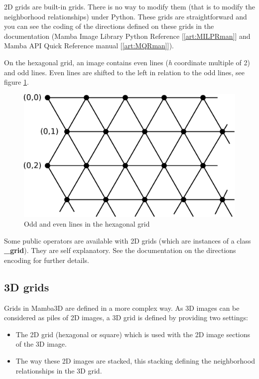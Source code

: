\documentclass[a4paper,10pt,oneside]{article}
\begin{document}
2D grids are built-in grids. There is no way to modify them (that is to modify the neighborhood
relationships) under Python. These grids are straightforward and you can see the coding of the directions
defined on these grids in the documentation (Mamba Image Library Python Reference [\ref{art:MILPRman}] and Mamba API
Quick Reference manual [\ref{art:MQRman}]).

On the hexagonal grid, an image contains even lines (\emph{h} coordinate multiple of 2) and odd lines. Even lines
are shifted to the left in relation to the odd lines, see figure \ref{fig:hex_grid}.
 
\begin{figure}
\centering
\includegraphics[scale=0.3]{figures/hex_grid.pdf}
\caption{Odd and even lines in the hexagonal grid}
\label{fig:hex_grid}
\end{figure}

Some public operators are available with 2D grids (which are instances of a class \textbf{\_grid}). They are self
explanatory. See the documentation on the directions encoding for further details.

\subsection{3D grids}
Grids in Mamba3D are defined in a more complex way. As 3D images can be considered as piles of 2D images,
a 3D grid is defined by providing two settings:

\begin{itemize}
\item The 2D grid (hexagonal or square) which is used with the 2D image sections of the 3D image.
\item The way these 2D images are stacked, this stacking defining the neighborhood relationships in the 3D grid.
\end{itemize}
\end{document}
